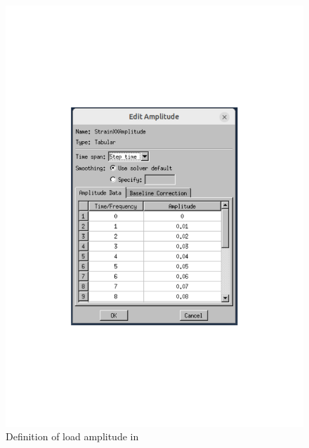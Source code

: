  

     \begin{figure}[H]
        \centering
        \begin{minipage}[T!]{1.0\textwidth}
            \centering
            \begin{minipage}[T!][9cm][T!]{0.35\textwidth}
                \includegraphics[width=1.0\textwidth]{Amplitude.pdf}
                \vfill{}
                \caption{Definition of load amplitude in }
                \label{fig:amplitudemenu}
            \end{minipage}
            \hspace{0.08\textwidth} %
            \begin{minipage}[T!][9cm][T!]{0.35\textwidth}

\end{minipage}
\end{minipage}
\end{figure}
